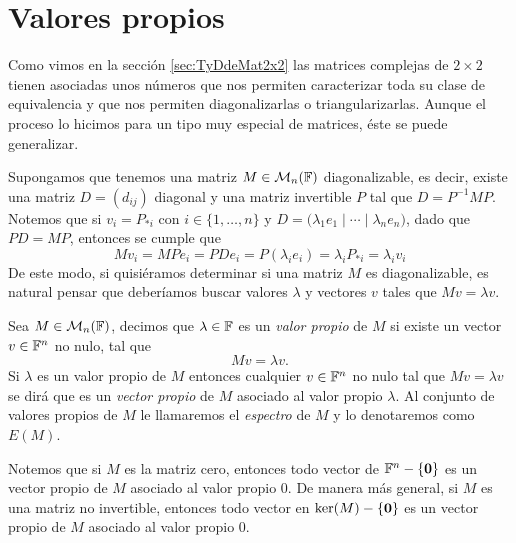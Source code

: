\section{Valores propios}

Como vimos en la sección \ref{sec:TyDdeMat2x2} las matrices complejas de $2\times 2$ tienen asociadas unos números que nos permiten caracterizar toda su clase de equivalencia y que nos permiten diagonalizarlas o triangularizarlas. Aunque el proceso lo hicimos para un tipo muy especial de matrices, éste se puede generalizar.

Supongamos que tenemos una matriz $M\in\mathcal{M}_n(\mathbb{F})$ diagonalizable, es decir, existe una matriz $D = (d_{ij})$ diagonal y una matriz invertible $P$ tal que $D =  P^{-1}MP$. Notemos que si $v_i = P_{*i}$ con $i \in \{1,\ldots,n\}$ y $D = \bigl( \lambda_1 e_1 \mid \cdots \mid \lambda_n e_n \bigr)$, dado que $PD = MP$, entonces se cumple que
  \[
    Mv_i = MPe_i = PD e_i = P(\lambda_i e_i) = \lambda_i P_{*i} = \lambda_i v_i
  \]
De este modo, si quisiéramos determinar si una matriz $M$ es diagonalizable, es natural pensar que deberíamos buscar valores $\lambda$ y vectores $v$ tales que $Mv = \lambda v$.

\begin{defi}
  Sea $M \in \mathcal{M}_n(\mathbb{F})$, decimos que $\lambda \in \mathbb{F}$ es un \emph{valor propio} de $M$ si existe un vector $v \in \mathbb{F}^n$ no nulo, tal que
    \[Mv = \lambda v.\]
  Si $\lambda$ es un valor propio de $M$ entonces cualquier $v \in \mathbb{F}^n$ no nulo tal que $Mv = \lambda v$ se dirá que es un \emph{vector propio} de $M$ asociado al valor propio $\lambda$. Al conjunto de valores propios de $M$ le llamaremos el \emph{espectro} de $M$ y lo denotaremos como $E(M)$.
\end{defi}

Notemos que si $M$ es la matriz cero, entonces todo vector de $\mathbb{F}^n - \{\mathbf{0}\}$ es un vector propio de $M$ asociado al valor propio $0$. De manera más general, si $M$ es una matriz no invertible, entonces todo vector en $\ker(M)-\{\mathbf{0}\}$ es un vector propio de $M$ asociado al valor propio $0$.

